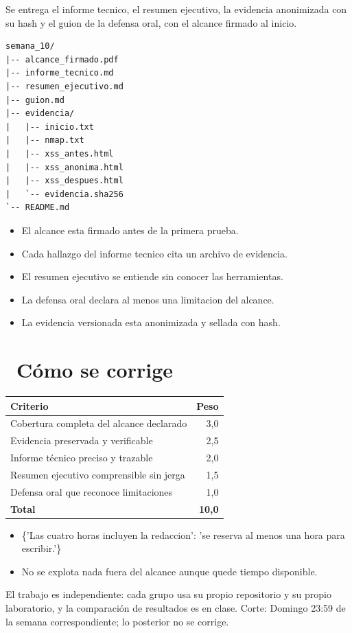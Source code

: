 \documentclass[11pt,a4paper]{article}
\newcommand{\iconotexto}[2]{\textcolor{cyanNeon}{\faIcon{#1}}~#2}
\begin{document}
Se entrega el informe tecnico, el resumen ejecutivo, la evidencia anonimizada con su hash y el guion de la defensa oral, con el alcance firmado al inicio.

\begin{lstlisting}[style=estiloCodigo]
semana_10/
|-- alcance_firmado.pdf
|-- informe_tecnico.md
|-- resumen_ejecutivo.md
|-- guion.md
|-- evidencia/
|   |-- inicio.txt
|   |-- nmap.txt
|   |-- xss_antes.html
|   |-- xss_anonima.html
|   |-- xss_despues.html
|   `-- evidencia.sha256
`-- README.md
\end{lstlisting}

\begin{itemize}[leftmargin=1.4em,itemsep=2pt,topsep=3pt]
  \item El alcance esta firmado antes de la primera prueba.
  \item Cada hallazgo del informe tecnico cita un archivo de evidencia.
  \item El resumen ejecutivo se entiende sin conocer las herramientas.
  \item La defensa oral declara al menos una limitacion del alcance.
  \item La evidencia versionada esta anonimizada y sellada con hash.
\end{itemize}

\section{\iconotexto{ruler-combined}{Cómo se corrige}}

\begin{tabularx}{\linewidth}{@{}X r@{}}
\toprule
Criterio & Peso\\
\midrule
Cobertura completa del alcance declarado & 3,0 \\
Evidencia preservada y verificable & 2,5 \\
Informe técnico preciso y trazable & 2,0 \\
Resumen ejecutivo comprensible sin jerga & 1,5 \\
Defensa oral que reconoce limitaciones & 1,0 \\
\midrule
\textbf{Total} & \textbf{10,0}\\
\bottomrule
\end{tabularx}

\begin{itemize}[leftmargin=1.4em,itemsep=2pt,topsep=3pt]
  \item \{'Las cuatro horas incluyen la redaccion': 'se reserva al menos una hora para escribir.'\}
  \item No se explota nada fuera del alcance aunque quede tiempo disponible.
\end{itemize}

\begin{cajaRecuerda}El trabajo es independiente: cada grupo usa su propio repositorio y su propio laboratorio, y la comparación de resultados es en clase. Corte: Domingo 23:59 de la semana correspondiente; lo posterior no se corrige.
\end{cajaRecuerda}
\end{document}
